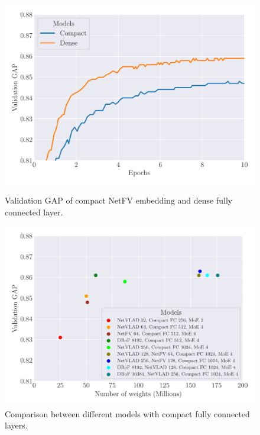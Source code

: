 \begin{figure}[H]
	\center
	\includegraphics[width=\scalefigure\textwidth]{figures/appendix/ap2-training_video_classification/graph_fc_circulant_embedding_netfv}
	\caption{Validation GAP of compact NetFV embedding and dense fully connected layer.}
	\label{figure:ap2-validation_gap_compact_netfv}
	\vspace{1cm}
	\includegraphics[width=\scalefigure\textwidth]{figures/appendix/ap2-training_video_classification/graph_benchmark_models}
	\caption{Comparison between different models with compact fully connected layers.}
	\label{figure:ap2-models}
\end{figure}




